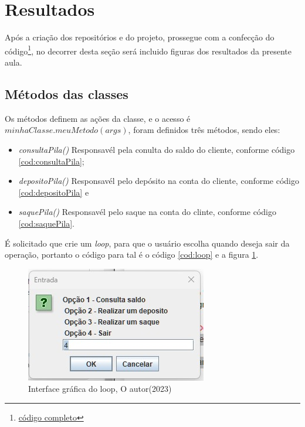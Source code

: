 \section{Resultados}

\par Após a criação dos repositórios e do projeto, prossegue com a confecção do código\footnote{\hyperref[anexo]{código completo}}, no decorrer desta seção será incluido figuras dos resultados da presente aula.




\subsection{Métodos das classes}

\par Os métodos definem as ações da classe, e o acesso é $minhaClasse.meuMetodo(args)$, foram definidos três métodos, sendo eles:
\begin{itemize}
  \item \textit{consultaPila()} Responsavél pela conulta do saldo do cliente, conforme código \ref{cod:consultaPila};
  \item \textit{depositoPila()} Responsavél pelo depósito na conta do cliente, conforme código \ref{cod:depositoPila} e
  \item \textit{saquePila()} Responsavél pelo saque na conta do clinte, conforme código \ref{cod:saquePila}.
\end{itemize}








\par É solicitado que crie um \textit{loop}, para que o usuário escolha quando deseja sair da operação, portanto o código para tal é o código \ref{cod:loop} e a figura \ref{fig:loop}.


\begin{figure}[h!]
  \centering
  \includegraphics[scale=0.8]{figure/menu.jpg}
  \caption{Interface gráfica do loop, O autor(2023)}\label{fig:loop}
\end{figure}

